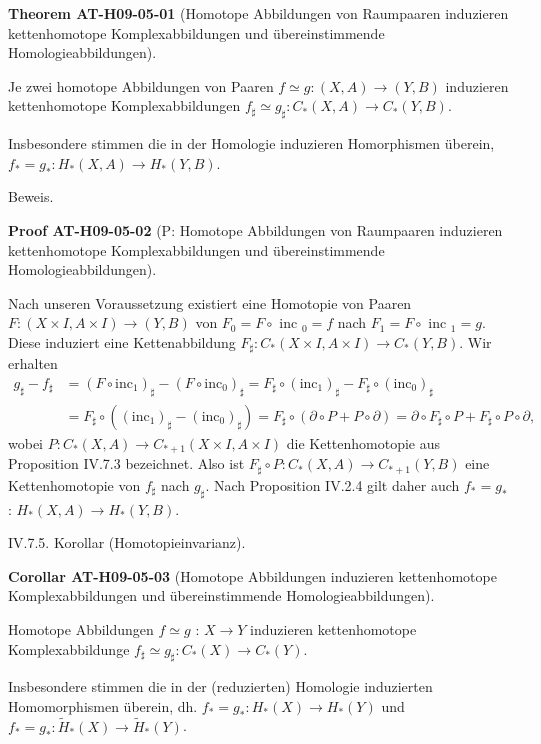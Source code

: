 \documentclass[10pt, letterpaper]{article}
\newcommand{\CustomHeading}[3]{%
  \par\medskip\noindent%
  \textbf{#1 #2} \textnormal{(#3)}.\enskip%
}
\newenvironment{THEO}[2]{\begin{unitbox}\CustomHeading{Theorem}{#1}{#2}}{\end{unitbox}}
\newenvironment{KORO}[2]{\begin{unitbox}\CustomHeading{Corollar}{#1}{#2}}{\end{unitbox}}
\newenvironment{PROOF}[2]{\begin{unitbox}\CustomHeading{Proof}{#1}{#2}}{\end{unitbox}}
\begin{document}
\begin{THEO}{AT-H09-05-01}{Homotope Abbildungen von Raumpaaren induzieren kettenhomotope Komplexabbildungen und übereinstimmende Homologieabbildungen}
Je zwei homotope Abbildungen von Paaren $f \simeq g:(X, A) \rightarrow(Y, B)$ induzieren kettenhomotope Komplexabbildungen $f_{\sharp} \simeq g_{\sharp}: C_*(X, A) \rightarrow C_*(Y, B)$. 

Insbesondere stimmen die in der Homologie induzieren Homorphismen überein, $f_*=g_*: H_*(X, A) \rightarrow H_*(Y, B)$.
\end{THEO}


Beweis. 

\begin{PROOF}{AT-H09-05-02}{P: Homotope Abbildungen von Raumpaaren induzieren kettenhomotope Komplexabbildungen und übereinstimmende Homologieabbildungen}
Nach unseren Voraussetzung existiert eine Homotopie von Paaren $F:(X \times I, A \times I) \rightarrow(Y, B)$ von $F_0=F \circ$ inc $_0=f$ nach $F_1=F \circ$ inc $_1=g$. Diese induziert eine Kettenabbildung $F_{\sharp}: C_*(X \times I, A \times I) \rightarrow C_*(Y, B)$. Wir erhalten
$$
\begin{aligned}
g_{\sharp}-f_{\sharp}&=\left(F \circ \mathrm{inc}_1\right)_{\sharp}-\left(F \circ \mathrm{inc}_0\right)_{\sharp}=F_{\sharp} \circ\left(\mathrm{inc}_1\right)_{\sharp}-F_{\sharp} \circ\left(\mathrm{inc}_0\right)_{\sharp} \\
& =F_{\sharp} \circ\left(\left(\mathrm{inc}_1\right)_{\sharp}-\left(\mathrm{inc}_0\right)_{\sharp}\right)=F_{\sharp} \circ(\partial \circ P+P \circ \partial)=\partial \circ F_{\sharp} \circ P+F_{\sharp} \circ P \circ \partial,
\end{aligned}
$$
wobei $P: C_*(X, A) \rightarrow C_{*+1}(X \times I, A \times I)$ die Kettenhomotopie aus Proposition IV.7.3 bezeichnet. Also ist $F_{\sharp} \circ P: C_*(X, A) \rightarrow C_{*+1}(Y, B)$ eine Kettenhomotopie von $f_{\sharp}$ nach $g_{\sharp}$. Nach Proposition IV.2.4 gilt daher auch $f_*=g_*$ : $H_*(X, A) \rightarrow H_*(Y, B)$.
\end{PROOF}



IV.7.5. Korollar (Homotopieinvarianz). 

\begin{KORO}{AT-H09-05-03}{Homotope Abbildungen induzieren kettenhomotope Komplexabbildungen und übereinstimmende Homologieabbildungen}
Homotope Abbildungen $f \simeq g$ : $X \rightarrow Y$ induzieren kettenhomotope Komplexabbildunge $f_{\sharp} \simeq g_{\sharp}: C_*(X) \rightarrow C_*(Y)$.

Insbesondere stimmen die in der (reduzierten) Homologie induzierten Homomorphismen überein, dh. $f_*=g_*: H_*(X) \rightarrow H_*(Y)$ und $f_*=g_*: \tilde{H}_*(X) \rightarrow \tilde{H}_*(Y)$.
\end{KORO}
\end{document}
